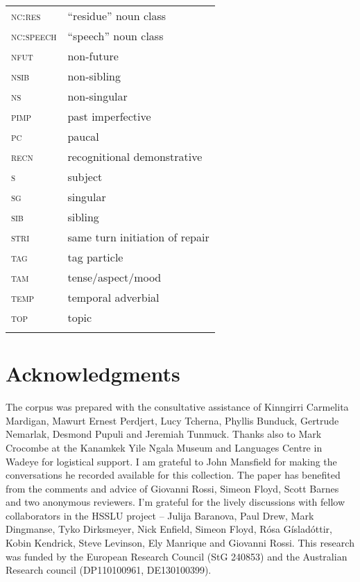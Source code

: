 \documentclass[output=paper,nonflat,colorlinks,citecolor=brown]{langsci/langscibook}
\begin{document}
\begin{tabularx}{.49\textwidth}{>{\scshape}lQ}
nc:res& “residue” noun class                 \\
nc:speech& “speech” noun class               \\
nfut& non-future                             \\
nsib& non-sibling                            \\
ns& non-singular                             \\
pimp& past imperfective                      \\
pc& paucal                                   \\
recn& recognitional demonstrative            \\
s& subject                                   \\
sg& singular                                 \\
sib& sibling                                 \\
stri& same turn initiation of repair         \\
tag& tag particle                            \\
tam& tense/aspect/mood                       \\
temp& temporal adverbial                     \\
top& topic                                   \\
\\
\end{tabularx}

\section*{Acknowledgments}

The corpus was prepared with the consultative assistance of Kinngirri Carmelita Mardigan, Mawurt Ernest Perdjert, Lucy Tcherna, Phyllis Bunduck, Gertrude Nemarlak, Desmond Pupuli and Jeremiah Tunmuck. Thanks also to Mark Crocombe at the Kanamkek Yile Ngala Museum and Languages Centre in Wadeye for logistical support. I am grateful to John Mansfield for making the conversations he recorded available for this collection. The paper has benefited from the comments and advice of Giovanni Rossi, Simeon Floyd, Scott Barnes and two anonymous reviewers. I’m grateful for the lively discussions with fellow collaborators in the HSSLU project – Julija Baranova, Paul Drew, Mark Dingmanse, Tyko Dirksmeyer, Nick Enfield, Simeon Floyd, Rósa Gísladóttir, Kobin Kendrick, Steve Levinson, Ely Manrique and Giovanni Rossi. This research was funded by the European Research Council (StG 240853) and the Australian Research council (DP110100961, DE130100399).

\sloppy
\printbibliography[heading=subbibliography,notkeyword=this]
\end{document}
